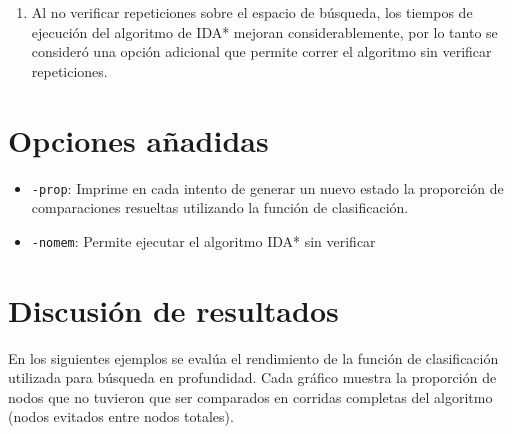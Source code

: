 \documentclass[letterpaper,12pt, titlepage]{article}
\newcommand{\ms}{\texttt}
\begin{document}
\begin{enumerate}
\item Al no verificar repeticiones sobre el espacio de búsqueda,
los tiempos de ejecución del algoritmo de IDA* mejoran considerablemente,
por lo tanto se consideró una opción adicional que permite correr el
algoritmo sin verificar repeticiones.

\end{enumerate}

\section{Opciones añadidas}

\begin{itemize}
\item \ms{-prop}: Imprime en cada intento de generar un nuevo estado
la proporción de comparaciones resueltas utilizando la función de
clasificación.

\item \ms{-nomem}: Permite ejecutar el algoritmo IDA* sin verificar

\end{itemize}

\section{Discusión de resultados}
En los siguientes ejemplos se evalúa el rendimiento
de la función de clasificación utilizada para
búsqueda en profundidad. Cada gráfico muestra la proporción
de nodos que no tuvieron que ser comparados
en corridas completas del algoritmo (nodos evitados entre nodos totales).
\pagebreak
\end{document}

